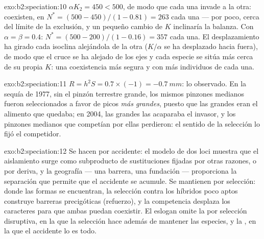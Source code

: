 \begin{solution}{exo:b2:speciation:10}
$\alpha K_2 = 450 < 500$, de modo que cada una invade a la otra: coexisten,
en $N^{*} = (500 - 450)/(1 - 0.81) = 263$ cada una --- por poco, cerca del
límite de la exclusión, y un pequeño cambio de $K$ inclinaría la balanza.
Con $\alpha = \beta = 0.4$: $N^{*} = (500 - 200)/(1 - 0.16) = 357$ cada
una. El desplazamiento ha girado cada isoclina alejándola de la otra
($K/\alpha$ se ha desplazado hacia fuera), de modo que el cruce se ha
alejado de los ejes y cada especie se sitúa más cerca de su propia $K$:
una coexistencia más segura y con más individuos de cada una.
\end{solution}

\begin{solution}{exo:b2:speciation:11}
$R = h^{2}S = 0.7\times(-1) = \qty{-0.7}{mm}$: lo observado. En la sequía
de 1977, sin el pinzón terrestre grande, los mismos pinzones medianos
fueron seleccionados a favor de picos \emph{más grandes}, puesto que las
 grandes eran el alimento que quedaba; en 2004, las 
grandes las acaparaba el invasor, y los pinzones medianos que competían
por ellas perdieron: el sentido de la selección lo fijó el competidor.
\end{solution}

\begin{solution}{exo:b2:speciation:12}
Se hacen por accidente: el modelo de dos loci muestra que el aislamiento
surge como subproducto de sustituciones fijadas por otras razones, o por
deriva, y la geografía --- una barrera, una fundación --- proporciona la
separación que permite que el accidente se acumule. Se mantienen por
selección: donde las formas se encuentran, la selección contra los
híbridos poco aptos construye barreras precigóticas (refuerzo), y la
competencia desplaza los caracteres para que ambas puedan coexistir. El
eslogan omite la  por selección disruptiva, en la
que la selección hace además de mantener las especies, y la ,
en la que el accidente lo es todo.
\end{solution}

